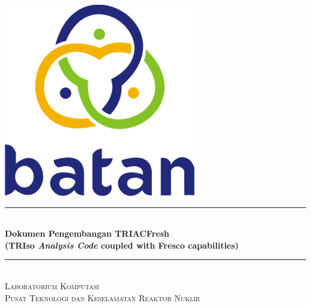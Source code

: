 \begin{titlepage}

\newcommand{\HRule}{\rule{\linewidth}{0.5mm}} %

\center %



\includegraphics[scale=.25]{pics/logo.png}\\[1cm] %


\HRule \\[0.4cm]
{ \huge \bfseries Dokumen Pengembangan TRIACFresh \\ (TRIso \textit{Analysis Code} coupled with Fresco capabilities)}\\[0.4cm] %
\HRule \\[1.5cm]

\textsc{Laboratorium Komputasi}\\[0.25cm] %
\textsc{\Large Pusat Teknologi dan Keselamatan Reaktor Nuklir}\\[1.5cm] %


\end{titlepage}
